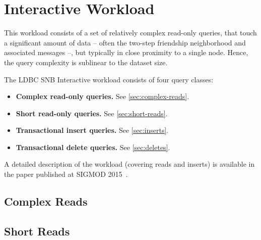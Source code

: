 \chapter{Interactive Workload}
\label{section:interactive}

This workload consists of a set of relatively complex read-only queries, that touch a significant
amount of data -- often the two-step friendship neighborhood and associated messages --, but typically in close proximity to a single node. Hence, the query complexity is sublinear to the dataset size.

The LDBC SNB Interactive workload consists of four query classes:

\begin{itemize}
\item \textbf{Complex read-only queries.} See \autoref{sec:complex-reads}.
\item \textbf{Short read-only queries.} See \autoref{sec:short-reads}.
\item \textbf{Transactional insert queries.} See \autoref{sec:inserts}.
\item \textbf{Transactional delete queries.} See \autoref{sec:deletes}.
\end{itemize}

A detailed description of the workload (covering reads and inserts) is available in the paper published at \mbox{SIGMOD} 2015~\cite{DBLP:conf/sigmod/ErlingALCGPPB15}.


\section{Complex Reads}
\label{sec:complex-reads}




\section{Short Reads}
\label{sec:short-reads}

